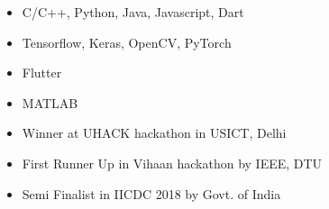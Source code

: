 \documentclass[10pt,a4paper,ragged2e]{altacv}
\begin{document}
\begin{itemize}
    \item C/C++, Python, Java, Javascript, Dart
    \smallskip
    \item Tensorflow, Keras, OpenCV, PyTorch
    \smallskip
    \item Flutter
    \smallskip
    \item MATLAB
\end{itemize}



\smallskip
\begin{itemize}
\item Winner at UHACK hackathon in USICT, Delhi
\smallskip
\item First Runner Up in Vihaan hackathon by IEEE, DTU
\smallskip
\item Semi Finalist in IICDC 2018 by Govt. of India

\smallskip
\end{itemize}






\end{document}
